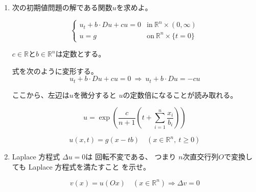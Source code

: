 \documentclass[12pt,b5paper]{ltjsarticle}
\begin{document}
\hrulefill
\newpage
\hrulefill

\begin{enumerate}
 \item


      次の初期値問題の解である関数$u$を求めよ。

      \begin{equation}
       \begin{cases}
        u_{t} +b\cdot Du + cu =0 & \text{in}\: \mathbb{R}^n \times (0,\infty)\\
        u=g & \text{on}\: \mathbb{R}^n \times \{t=0\}
       \end{cases}
      \end{equation}

      $c\in\mathbb{R}$と$b\in\mathbb{R}^{n}$は定数とする。

      \dotfill


      式を次のように変形する。
      \begin{equation}
       u_{t} +b\cdot Du + cu =0
        \: \Rightarrow \:
        u_{t} +b\cdot Du = - cu
      \end{equation}

      ここから、左辺は$u$を微分すると
      $u$の定数倍になることが読み取れる。

      \begin{equation}
       u
        =\exp\left(
                \frac{c}{n+1}\left( t + \sum_{i=1}^{n}\frac{x_{i}}{b_{i}} \right)
              \right)
      \end{equation}
      


      \begin{equation}
       u(x,t) = g(x-tb) \quad (x\in\mathbb{R}^{n},\: t\geq 0)
      \end{equation}

      \hrulefill


 \item

      Laplace 方程式 $\Delta u =0$は
      回転不変である、
      つまり
      $n$次直交行列$O$で変換しても
      Laplace 方程式を満たすこと
      を示せ。

      \begin{equation}
       v(x) = u(Ox) \quad (x\in\mathbb{R}^{n})
        \Rightarrow
        \Delta v = 0
      \end{equation}

      \dotfill


\end{enumerate}
\end{document}
